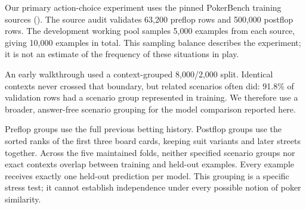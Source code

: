 \documentclass[
  11pt,
  letterpaper,
]{article}
\begin{document}
Our primary action-choice experiment uses the pinned PokerBench training
sources (). The source
audit validates 63,200 preflop rows and 500,000 postflop rows. The
development working pool samples 5,000 examples from each source, giving
10,000 examples in total. This sampling balance describes the
experiment; it is not an estimate of the frequency of these situations
in play.

An early walkthrough used a context-grouped 8,000/2,000 split. Identical
contexts never crossed that boundary, but related scenarios often did:
91.8\% of validation rows had a scenario group represented in training.
We therefore use a broader, answer-free scenario grouping for the model
comparison reported here.

Preflop groups use the full previous betting history. Postflop groups
use the sorted ranks of the first three board cards, keeping suit
variants and later streets together. Across the five maintained folds,
neither specified scenario groups nor exact contexts overlap between
training and held-out examples. Every example receives exactly one
held-out prediction per model. This grouping is a specific stress test;
it cannot establish independence under every possible notion of poker
similarity.
\end{document}
